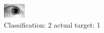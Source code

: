 \begin{figure}[h!]
\begin{center}
\includegraphics[width=0.60\columnwidth]{figures/ID1544_class_2_target_1.png}
\end{center}
\caption{ Classification: 2 actual target: 1}
\label{fig:ID1544_class_2_target_1}
\end{figure}
